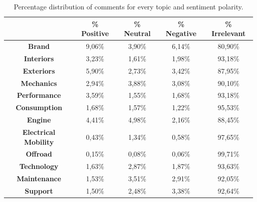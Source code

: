 \begin{table}[ht]
	\renewcommand{\arraystretch}{1.5}
	\centering
	\begin{tabular}{| c | c | c | c | c |} 
		\hline
		& \textbf{\% Positive} & \textbf{\% Neutral} & \textbf{\% Negative} & \textbf{\% Irrelevant} \\ [.06cm]
		\hline
		\hline
		\textbf{Brand}& 9,06\% & 3,90\% & 6,14\% & 80,90\% \\ [.06cm]
		\hline
		\textbf{Interiors}& 3,23\% & 1,61\% & 1,98\% & 93,18\% \\ [.06cm]
		\hline
		\textbf{Exteriors}& 5,90\% & 2,73\% & 3,42\% & 87,95\%  \\ [.06cm]
		\hline
		\textbf{Mechanics}& 2,94\% & 3,88\% & 3,08\% & 90,10\% \\ [.06cm]
		\hline
		\textbf{Performance} & 3,59\% & 1,55\% & 1,68\% & 93,18\% \\ [.06cm]
		\hline
		\textbf{Consumption} & 1,68\% & 1,57\% & 1,22\% & 95,53\% \\ [.06cm]
		\hline
		\textbf{Engine}& 4,41\% & 4,98\% & 2,16\% & 88,45\% \\ [.06cm]
		\hline
		\textbf{Electrical Mobility} & 0,43\% & 1,34\% & 0,58\% & 97,65\% \\ [.06cm]
		\hline
		\textbf{Offroad} & 0,15\% & 0,08\% & 0,06\% & 99,71\% \\ [.06cm]
		\hline
		\textbf{Technology} & 1,63\% & 2,87\% & 1,87\% & 93,63\% \\ [.06cm]
		\hline
		\textbf{Maintenance} & 1,53\% & 3,51\% & 2,91\% & 92,05\% \\ [.06cm]
		\hline
		\textbf{Support} & 1,50\% & 2,48\% & 3,38\% & 92,64\% \\ [.06cm]
		\hline
		
	\end{tabular}
	\caption{Percentage distribution of comments for every topic and sentiment polarity.}
	\label{table:annotations-distribution-perc}
\end{table}





